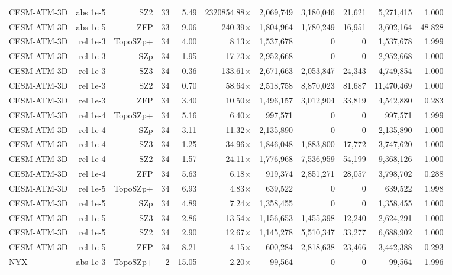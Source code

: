 \begin{tabular}{lrrrrrrrrrr}
CESM-ATM-3D & abs 1e-5 & SZ2 & 33 & 5.49 & 2320854.88$\times$ & 2,069,749 & 3,180,046 & 21,621 & 5,271,415 & 1.000 \\
CESM-ATM-3D & abs 1e-5 & ZFP & 33 & 9.06 & 240.39$\times$ & 1,804,964 & 1,780,249 & 16,951 & 3,602,164 & 48.828 \\
CESM-ATM-3D & rel 1e-3 & TopoSZp+ & 34 & 4.00 & 8.13$\times$ & 1,537,678 & 0 & 0 & 1,537,678 & 1.999 \\
CESM-ATM-3D & rel 1e-3 & SZp & 34 & 1.95 & 17.73$\times$ & 2,952,668 & 0 & 0 & 2,952,668 & 1.000 \\
CESM-ATM-3D & rel 1e-3 & SZ3 & 34 & 0.36 & 133.61$\times$ & 2,671,663 & 2,053,847 & 24,343 & 4,749,854 & 1.000 \\
CESM-ATM-3D & rel 1e-3 & SZ2 & 34 & 0.70 & 58.64$\times$ & 2,518,758 & 8,870,023 & 81,687 & 11,470,469 & 1.000 \\
CESM-ATM-3D & rel 1e-3 & ZFP & 34 & 3.40 & 10.50$\times$ & 1,496,157 & 3,012,904 & 33,819 & 4,542,880 & 0.283 \\
CESM-ATM-3D & rel 1e-4 & TopoSZp+ & 34 & 5.16 & 6.40$\times$ & 997,571 & 0 & 0 & 997,571 & 1.999 \\
CESM-ATM-3D & rel 1e-4 & SZp & 34 & 3.11 & 11.32$\times$ & 2,135,890 & 0 & 0 & 2,135,890 & 1.000 \\
CESM-ATM-3D & rel 1e-4 & SZ3 & 34 & 1.25 & 34.96$\times$ & 1,846,048 & 1,883,800 & 17,772 & 3,747,620 & 1.000 \\
CESM-ATM-3D & rel 1e-4 & SZ2 & 34 & 1.57 & 24.11$\times$ & 1,776,968 & 7,536,959 & 54,199 & 9,368,126 & 1.000 \\
CESM-ATM-3D & rel 1e-4 & ZFP & 34 & 5.63 & 6.18$\times$ & 919,374 & 2,851,271 & 28,057 & 3,798,702 & 0.288 \\
CESM-ATM-3D & rel 1e-5 & TopoSZp+ & 34 & 6.93 & 4.83$\times$ & 639,522 & 0 & 0 & 639,522 & 1.998 \\
CESM-ATM-3D & rel 1e-5 & SZp & 34 & 4.89 & 7.24$\times$ & 1,358,455 & 0 & 0 & 1,358,455 & 1.000 \\
CESM-ATM-3D & rel 1e-5 & SZ3 & 34 & 2.86 & 13.54$\times$ & 1,156,653 & 1,455,398 & 12,240 & 2,624,291 & 1.000 \\
CESM-ATM-3D & rel 1e-5 & SZ2 & 34 & 2.90 & 12.67$\times$ & 1,145,278 & 5,510,347 & 33,277 & 6,688,902 & 1.000 \\
CESM-ATM-3D & rel 1e-5 & ZFP & 34 & 8.21 & 4.15$\times$ & 600,284 & 2,818,638 & 23,466 & 3,442,388 & 0.293 \\
NYX & abs 1e-3 & TopoSZp+ & 2 & 15.05 & 2.20$\times$ & 99,564 & 0 & 0 & 99,564 & 1.996 \\

\end{tabular}
